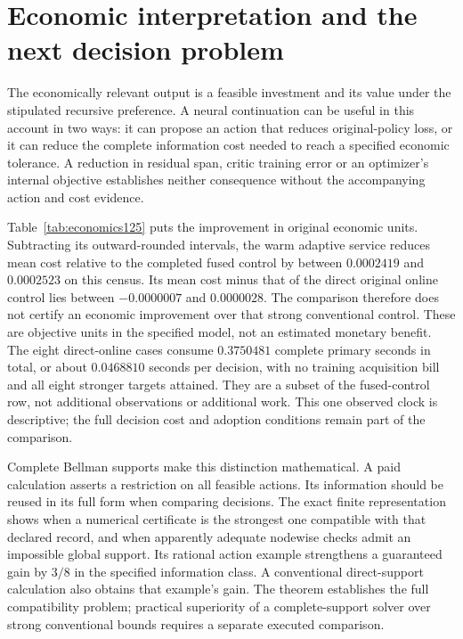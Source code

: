 \section{Economic interpretation and the next decision problem}
\label{sec:discussion125}

The economically relevant output is a feasible investment and its value
under the stipulated recursive preference. A neural continuation can be
useful in this account in two ways: it can propose an action that reduces
original-policy loss, or it can reduce the complete information cost needed
to reach a specified economic tolerance. A reduction in residual span,
critic training error or an optimizer's internal objective establishes
neither consequence without the accompanying action and cost evidence.

Table~\ref{tab:economics125} puts the improvement in original economic
units. Subtracting its outward-rounded intervals, the warm adaptive
service reduces mean cost relative to the completed fused control by
between $0.0002419$ and $0.0002523$ on this census. Its mean cost minus
that of the direct original online control lies between $-0.0000007$
and $0.0000028$. The comparison therefore does not certify an economic
improvement over that strong conventional control. These are objective
units in the specified model, not an estimated monetary benefit.
The eight direct-online cases consume $0.3750481$ complete primary
seconds in total, or about $0.0468810$ seconds per decision, with no
training acquisition bill and all eight stronger targets attained.
They are a subset of the fused-control row, not additional observations
or additional work. This one observed clock is descriptive; the full
decision cost and adoption conditions remain part of the comparison.

Complete Bellman supports make this distinction mathematical. A paid
calculation asserts a restriction on all feasible actions. Its information
should be reused in its full form when comparing decisions. The exact
finite representation shows when a numerical certificate is the strongest
one compatible with that declared record, and when apparently adequate
nodewise checks admit an impossible global support. Its rational action
example strengthens a guaranteed gain by $3/8$ in the specified
information class. A conventional direct-support calculation also obtains
that example's gain. The theorem establishes the full compatibility
problem; practical superiority of a complete-support solver over strong
conventional bounds requires a separate executed comparison.

